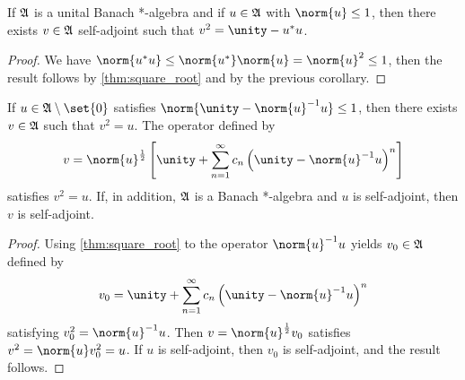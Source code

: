\begin{corollary}
    If \(\mathfrak{A}\) is a unital Banach *-algebra and if \(u \in \mathfrak{A}\) with \(\norm{u} \leq 1\), then there exists \(v \in \mathfrak{A}\) self-adjoint such that \(v^2 = \unity - u^*u\).
\end{corollary}
\begin{proof}
    We have \(\norm{u^*u} \leq \norm{u^*}\norm{u} = \norm{u}^2 \leq 1\), then the result follows by \cref{thm:square_root} and by the previous corollary.
\end{proof}
\begin{corollary}
    If \(u \in \algebra{A} \setminus\set{0}\) satisfies \(\norm{\unity - \norm{u}^{-1} u} \leq 1\), then there exists \(v \in \mathfrak{A}\) such that \(v^2 = u\). The operator defined by
    \begin{equation*}
        v = \norm{u}^{\frac12} \left[\unity + \sum_{n = 1}^\infty c_n\left(\unity - \norm{u}^{-1}u\right)^n\right]
    \end{equation*}
    satisfies \(v^2 = u\). If, in addition, \(\mathfrak{A}\) is a Banach *-algebra and \(u\) is self-adjoint, then \(v\) is self-adjoint.
\end{corollary}
\begin{proof}
    Using \cref{thm:square_root} to the operator \(\norm{u}^{-1}u\) yields \(v_0 \in \mathfrak{A}\) defined by
    \begin{equation*}
        v_0  = \unity + \sum_{n = 1}^\infty c_n\left(\unity - \norm{u}^{-1}u\right)^n
    \end{equation*}
    satisfying \(v_0^2 = \norm{u}^{-1} u\). Then \(v = \norm{u}^{\frac12}v_0\) satisfies \(v^2 = \norm{u} v_0^2 = u\). If \(u\) is self-adjoint, then \(v_0\) is self-adjoint, and the result follows.
\end{proof}

